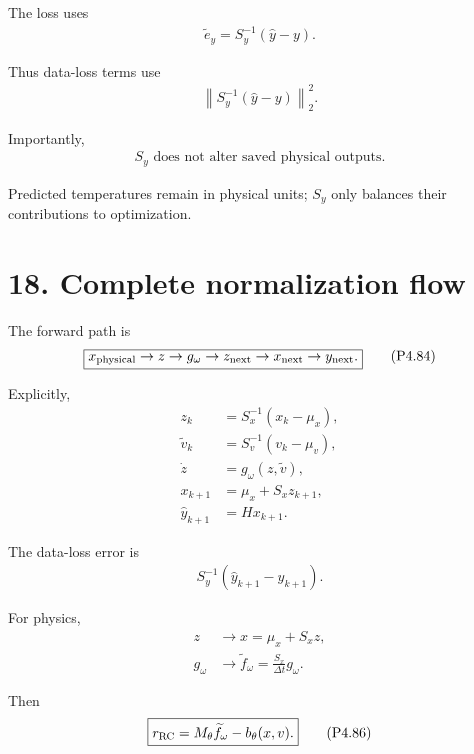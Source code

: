\documentclass[11pt]{article}
\begin{document}
The loss uses
\begin{align}
\boxed{
\widetilde e_y
=
S_y^{-1}(\widehat y-y).
}
\tag{P4.81}
\end{align}

Thus data-loss terms use
\begin{align}
\boxed{
\left\|
S_y^{-1}(\widehat y-y)
\right\|_2^2.
}
\tag{P4.82}
\end{align}

Importantly,
\begin{align}
\boxed{
S_y\text{ does not alter saved physical outputs.}
}
\tag{P4.83}
\end{align}

Predicted temperatures remain in physical units; \(S_y\) only balances their contributions to optimization.

\section*{18. Complete normalization flow}

The forward path is
\begin{align}
\boxed{
x_{\rm physical}
\rightarrow
z
\rightarrow
g_\omega
\rightarrow
z_{\rm next}
\rightarrow
x_{\rm next}
\rightarrow
y_{\rm next}.
}
\tag{P4.84}
\end{align}

Explicitly,
\begin{align}
z_k&=S_x^{-1}(x_k-\mu_x),\\
\widetilde v_k&=S_v^{-1}(v_k-\mu_v),\\
\dot z&=g_\omega(z,\widetilde v),\\
x_{k+1}&=\mu_x+S_xz_{k+1},\\
\widehat y_{k+1}&=Hx_{k+1}.
\end{align}

The data-loss error is
\begin{align}
\boxed{
S_y^{-1}(\widehat y_{k+1}-y_{k+1}).
}
\tag{P4.85}
\end{align}

For physics,
\begin{align}
z&\rightarrow x=\mu_x+S_xz,\\
g_\omega&\rightarrow
\widetilde f_\omega=\frac{S_x}{\Delta t}g_\omega.
\end{align}

Then
\begin{align}
\boxed{
r_{\rm RC}
=
M_\theta\widetilde f_\omega-b_\theta(x,v).
}
\tag{P4.86}
\end{align}
\end{document}
